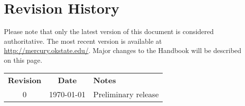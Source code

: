 \section*{Revision History}
Please note that only the latest version of this document is considered authoritative. The most recent version is available at \url{http://mercury.okstate.edu/}. Major changes to the Handbook will be described on this page.

\begin{tabular}{ccl}
\textbf{Revision}	&	\textbf{Date}				&	\textbf{Notes} \\
0					&	\today 						&	Preliminary release \\
\end{tabular}
